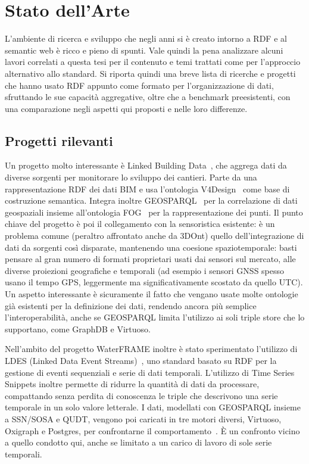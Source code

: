 \section{Stato dell'Arte}
\label{sec:prior_works}

L'ambiente di ricerca e sviluppo che negli anni si è creato intorno a RDF e al semantic web è ricco e pieno di spunti.
Vale quindi la pena analizzare alcuni lavori correlati a questa tesi per il contenuto e temi trattati come per l'approccio
alternativo allo standard.
Si riporta quindi una breve lista di ricerche e progetti che hanno usato RDF appunto come formato per l'organizzazione 
di dati, sfruttando le sue capacità aggregative, oltre che a benchmark preesistenti, con una comparazione negli aspetti
qui proposti e nelle loro differenze.

\subsection{Progetti rilevanti}

Un progetto molto interessante è Linked Building Data~\cite{bassier2022lbd}, che aggrega dati da diverse sorgenti per monitorare
lo sviluppo dei cantieri. Parte da una rappresentazione RDF dei dati BIM e usa l'ontologia V4Design~\cite{bassier2020v4design}
come base di costruzione semantica. Integra inoltre GEOSPARQL~\cite{ogc-geosparql11} per la correlazione di dati geospaziali
insieme all'ontologia FOG~\cite{bonduel2019fog} per la rappresentazione dei punti.
Il punto chiave del progetto è poi il collegamento con la sensoristica esistente: è un problema comune (peraltro affrontato 
anche da 3DOnt) quello dell'integrazione di dati da sorgenti così disparate, mantenendo una coesione spaziotemporale:
basti pensare al gran numero di formati proprietari usati dai sensori sul mercato, alle diverse proiezioni geografiche e
temporali (ad esempio i sensori GNSS spesso usano il tempo GPS, leggermente ma significativamente scostato da quello UTC).
Un aspetto interessante è sicuramente il fatto che vengano usate molte ontologie già esistenti per la definizione dei dati,
rendendo ancora più semplice l'interoperabilità, anche se GEOSPARQL limita l'utilizzo ai soli triple store che lo supportano,
come GraphDB e Virtuoso.

\par Nell'ambito del progetto WaterFRAME inoltre è stato sperimentato l'utilizzo di LDES (Linked Data Event
Streams)~\cite{ldes-spec}, uno standard basato su RDF per la gestione di eventi sequenziali e serie di dati temporali.
L'utilizzo di Time Series Snippets inoltre permette di ridurre la quantità di dati da processare, compattando
senza perdita di conoscenza le triple che descrivono una serie temporale in un solo valore letterale.
I dati, modellati con GEOSPARQL insieme a SSN/SOSA e QUDT, vengono poi caricati in tre motori diversi, Virtuoso, Oxigraph
e Postgres, per confrontarne il comportamento~\cite{abdelfatah2026water}. È un confronto vicino a quello condotto qui,
anche se limitato a un carico di lavoro di sole serie temporali.

